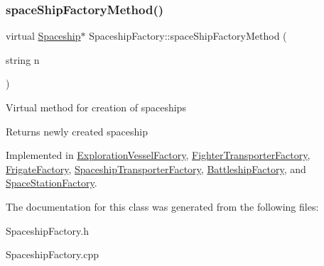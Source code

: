 \subsubsection{\texorpdfstring{space\+Ship\+Factory\+Method()}{spaceShipFactoryMethod()}}
{\footnotesize\ttfamily virtual \hyperlink{classSpaceship}{Spaceship}$\ast$ Spaceship\+Factory\+::space\+Ship\+Factory\+Method (\begin{DoxyParamCaption}\item[{string}]{n }\end{DoxyParamCaption})\hspace{0.3cm}{\ttfamily [pure virtual]}}

Virtual method for creation of spaceships \begin{DoxyReturn}{Returns}
newly created spaceship 
\end{DoxyReturn}


Implemented in \hyperlink{classExplorationVesselFactory_a67f065b62fedea7805291bd7a3d0b81d}{Exploration\+Vessel\+Factory}, \hyperlink{classFighterTransporterFactory_a1f2a5002cb9ea812fee8d224884fbdff}{Fighter\+Transporter\+Factory}, \hyperlink{classFrigateFactory_a52216b3322eb2ebd3b695d3275db28e1}{Frigate\+Factory}, \hyperlink{classSpaceshipTransporterFactory_a8bcd955724ffca8ffdc07d2ef1561d24}{Spaceship\+Transporter\+Factory}, \hyperlink{classBattleshipFactory_a1d85420a3be7db3e96e9c8b33a387330}{Battleship\+Factory}, and \hyperlink{classSpaceStationFactory_a21bbba99fbe7a2edeb3e63177d7f2e1c}{Space\+Station\+Factory}.



The documentation for this class was generated from the following files\+:\begin{DoxyCompactItemize}
\item 
Spaceship\+Factory.\+h\item 
Spaceship\+Factory.\+cpp\end{DoxyCompactItemize}
